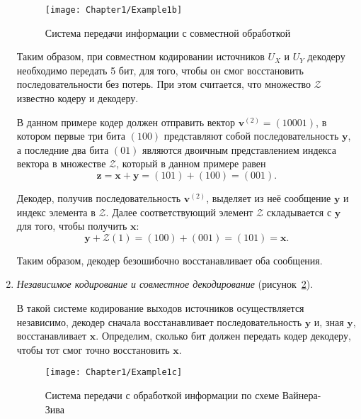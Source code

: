 \begin{enumerate}
\begin{figure}[thbp]
\begin{center}
\texttt{[image: Chapter1/Example1b]}
\caption{Система передачи информации с совместной обработкой}
\label{fig:Example1b}
\end{center}
\end{figure}

Таким образом, при совместном кодировании источников $U_X$ и $U_Y$ декодеру необходимо передать 5 бит, для того, чтобы он смог восстановить последовательности без потерь. При этом считается, что множество $\mathcal{Z}$ известно кодеру и декодеру.

В данном примере кодер должен отправить вектор $\mathbf{v}^{(2)}=(10001)$, в котором первые три бита $ (100) $ представляют собой последовательность $\mathbf{y}$, а последние два бита $(01)$ являются двоичным представлением  индекса вектора в множестве $\mathcal{Z}$, который в данном примере равен
\begin{equation*}
\mathbf{z} = \mathbf{x} + \mathbf{y} = (101) + (100) = (001).
\end{equation*}

Декодер, получив последовательность $\mathbf{v}^{(2)}$, выделяет из неё сообщение $\mathbf{y}$ и индекс элемента в $\mathcal{Z}$. Далее соответствующий элемент $\mathcal{Z}$ складывается с $\mathbf{y}$ для того, чтобы получить $\mathbf{x}$:
\begin{equation*}
\mathbf{y} + \mathcal{Z}(1) = (100) + (001) = (101) = \mathbf{x}.
\end{equation*}

Таким образом, декодер безошибочно восстанавливает оба сообщения.

\item \emph{Независимое кодирование и совместное декодирование} (рисунок~\ref{fig:Example1c}).

В такой системе кодирование выходов источников осуществляется независимо, декодер сначала восстанавливает последовательность $\mathbf{y}$ и, зная $\mathbf{y}$, восстанавливает $\mathbf{x}$. Определим, сколько бит должен передать кодер декодеру, чтобы тот смог точно восстановить $\mathbf{x}$. 

\begin{figure}[thbp]
\begin{center}
\texttt{[image: Chapter1/Example1c]}
\caption{Система передачи с обработкой информации по схеме Вайнера-Зива}
\label{fig:Example1c}
\end{center}
\end{figure}


\end{enumerate}

